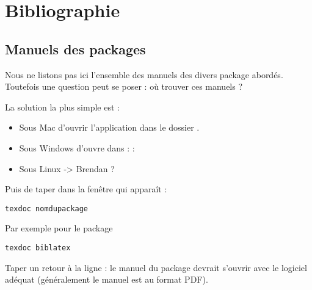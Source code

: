 \chapter{Bibliographie}

\section{Manuels des packages}

Nous ne listons pas ici l'ensemble des manuels des divers package abordés. Toutefois une question peut se poser : où trouver ces manuels ?

La solution la plus simple est :
\begin{itemize}
\item Sous Mac d'ouvrir l'application  dans le dossier .
\item Sous Windows d'ouvre  dans  :  : 
\item Sous Linux -> Brendan ?
\end{itemize}

Puis de taper dans la fenêtre qui apparaît :

\begin{verbatim}
texdoc nomdupackage
\end{verbatim}

Par exemple pour le package 

\begin{verbatim}
texdoc biblatex
\end{verbatim}

Taper un retour à la ligne : le manuel du package devrait s'ouvrir avec le logiciel adéquat (généralement le manuel est au format PDF).
